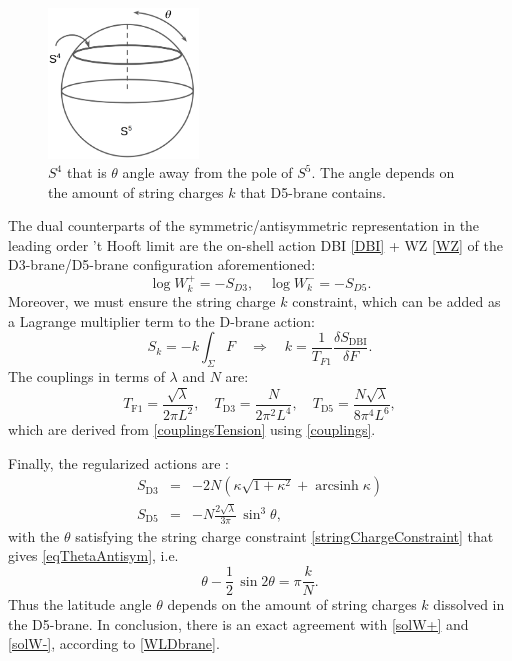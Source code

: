 \begin{figure}[t]
\begin{center}
\includegraphics[width=4cm]{Images/S5.png}
\end{center}
\caption{\label{fig:S5} $S^4$ that is $\theta$ angle away from the pole of $S^5$. 
The angle depends on the amount of string charges $k$ that D5-brane contains.}
\end{figure}


The dual counterparts of the symmetric/antisymmetric representation in the leading order 't Hooft limit
are the on-shell action DBI \eqref{DBI} + WZ \eqref{WZ} of the D3-brane/D5-brane configuration aforementioned:
\begin{equation}\label{WLDbrane}
 \log W^{+}_k = - S_{D3}, \quad \log W^{-}_k = - S_{D5}.
\end{equation}
Moreover, we must ensure the string charge $k$ constraint, which can be added as a Lagrange multiplier term to the D-brane action:
\begin{equation} \label{stringChargeConstraint}
S_k = - k  \int_\Sigma F 
\quad \Rightarrow \quad  
k = \dfrac{1}{T_{F1}} \dfrac{\delta S_\text{DBI}}{\delta F} .
\end{equation}
The couplings in terms of $\lambda$ and $N$ are:
\begin{equation}
 T_\text{F1} = \dfrac{\sqrt{\lambda}}{2\pi L^2},
 \quad
 T_\text{D3} = \dfrac{N}{2\pi^2 L^4},
 \quad 
 T_\text{D5} = \dfrac{N\sqrt{\lambda}}{8\pi^4 L^6},
\end{equation}
which are derived from \eqref{couplingsTension} using \eqref{couplings}.

Finally, the regularized actions are \cite{Drukker:2005kx, Yamaguchi:2006tq, Zarembo:2016bbk}: 
\begin{eqnarray}
 S_\text{D3} &=& - 2 N  (\kappa\sqrt{1+\kappa^2}+\mathop{\mathrm{arcsinh}}\kappa)\\
 S_\text{D5} &=& - N \frac{2\sqrt{\lambda }}{3\pi}\,\sin^3\theta,
\end{eqnarray}
with the $\theta$ satisfying the string charge constraint \eqref{stringChargeConstraint} that gives \eqref{eqThetaAntisym}, i.e. 
\begin{equation}
 \theta -\frac{1}{2}\,\sin 2\theta =\pi \frac{k}{N}.
\end{equation}
Thus the latitude angle $\theta$ depends on the amount of string charges $k$ dissolved in the D5-brane.
In conclusion, there is an exact agreement with \eqref{solW+} and \eqref{solW-}, according to \eqref{WLDbrane}.




